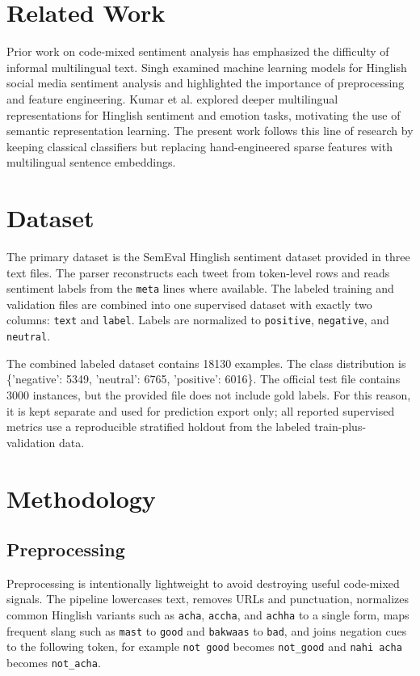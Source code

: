 \documentclass[11pt,a4paper]{article}
\begin{document}
\section{Related Work}
Prior work on code-mixed sentiment analysis has emphasized the difficulty of informal multilingual text. Singh \cite{singh2021hinglish} examined machine learning models for Hinglish social media sentiment analysis and highlighted the importance of preprocessing and feature engineering. Kumar et al. \cite{kumar2023multitask} explored deeper multilingual representations for Hinglish sentiment and emotion tasks, motivating the use of semantic representation learning. The present work follows this line of research by keeping classical classifiers but replacing hand-engineered sparse features with multilingual sentence embeddings.

\section{Dataset}
The primary dataset is the SemEval Hinglish sentiment dataset provided in three text files. The parser reconstructs each tweet from token-level rows and reads sentiment labels from the \texttt{meta} lines where available. The labeled training and validation files are combined into one supervised dataset with exactly two columns: \texttt{text} and \texttt{label}. Labels are normalized to \texttt{positive}, \texttt{negative}, and \texttt{neutral}.

The combined labeled dataset contains 18130 examples. The class distribution is \{'negative': 5349, 'neutral': 6765, 'positive': 6016\}. The official test file contains 3000 instances, but the provided file does not include gold labels. For this reason, it is kept separate and used for prediction export only; all reported supervised metrics use a reproducible stratified holdout from the labeled train-plus-validation data.

\section{Methodology}
\subsection{Preprocessing}
Preprocessing is intentionally lightweight to avoid destroying useful code-mixed signals. The pipeline lowercases text, removes URLs and punctuation, normalizes common Hinglish variants such as \texttt{acha}, \texttt{accha}, and \texttt{achha} to a single form, maps frequent slang such as \texttt{mast} to \texttt{good} and \texttt{bakwaas} to \texttt{bad}, and joins negation cues to the following token, for example \texttt{not good} becomes \texttt{not\_good} and \texttt{nahi acha} becomes \texttt{not\_acha}.
\end{document}
